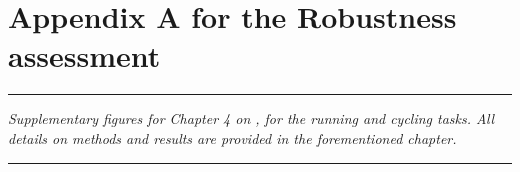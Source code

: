 
\appendix
\renewcommand\chaptername{Appendix~}

\lhead[\fancyplain{}{\leftmark}]%
      {\fancyplain{}{}} %
\chead[\fancyplain{}{}]%
      {\fancyplain{}{}}
\rhead[\fancyplain{}{}]%
      {\fancyplain{}{\rightmark}}%
\lfoot[\fancyplain{}{}]%
      {\fancyplain{}{}}
\cfoot[\fancyplain{}{\thepage}]%
      {\fancyplain{}{\thepage}} %
\rfoot[\fancyplain{}{}]%
     {\fancyplain{}{\scriptsize}}



\chapter{Appendix A for the Robustness assessment}
\label{Ann:1}


\begin{center}
\rule{0.7\linewidth}{.5pt}
\begin{minipage}{0.7\linewidth}
\smallskip

\textit{
Supplementary figures for Chapter 4 on , for the running and cycling tasks. \newline\newline All details on methods and results are provided in the forementioned chapter.
}

\end{minipage}
\smallskip
\rule{0.7\linewidth}{.5pt}
\end{center}

\minitoc
\newpage



